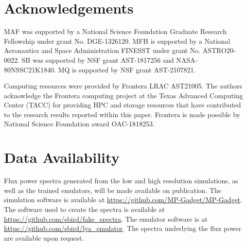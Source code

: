 \documentclass[a4paper,11pt]{article}
\begin{document}
\section*{Acknowledgements}
MAF was supported by a National Science Foundation Graduate Research Fellowship under grant No. DGE-1326120. MFH is supported by a National Aeronautics and Space Administration FINESST under grant No. ASTRO20-0022. SB was supported by NSF grant AST-1817256 and NASA-80NSSC21K1840. MQ is supported by NSF grant AST-2107821.

Computing resources were provided by Frontera LRAC AST21005.
The authors acknowledge the Frontera computing project at the Texas Advanced Computing Center (TACC) for providing HPC and storage resources that have contributed to the research results reported within this paper.
Frontera is made possible by National Science Foundation award OAC-1818253.

\section*{Data Availability}

Flux power spectra generated from the low and high resolution simulations, as well as the trained emulators, will be made available on publication. The simulation software is available at \url{https://github.com/MP-Gadget/MP-Gadget}. The software used to create the spectra is available at \url{https://github.com/sbird/fake_spectra}. The emulator software is  at \url{https://github.com/sbird/lya_emulator}. The spectra underlying the flux power are available upon request.




\appendix

\label{lastpage}
\end{document}
